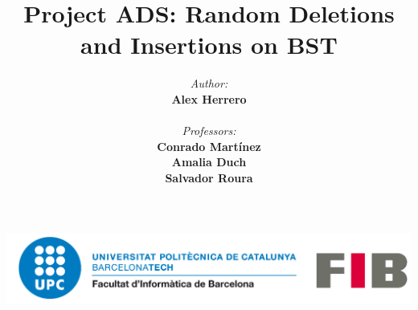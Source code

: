\documentclass{beamer}
\begin{document}

\title[Random Deletions and Insertions on BST]{
    Project ADS: Random Deletions and Insertions on BST
}

\author[A.Herrero]{
  \begin{minipage}[t]{0.5\textwidth}
    \raggedright
    \small \textit{Author:} \\
    \textbf{Alex Herrero} \\
    \vspace{1cm} %
  \end{minipage}%
  \begin{minipage}[t]{0.5\textwidth}
    \raggedleft
    \small \textit{Professors:} \\
    \textbf{Conrado Martínez} \\
    \textbf{Amalia Duch} \\
    \textbf{Salvador Roura} \\
  \end{minipage} \\
  \vspace{1cm} %
  \begin{center}
    \includegraphics[scale=0.15]{logo-upc.png}
  \end{center}
}

\beamertemplatenavigationsymbolsempty




\AtBeginSection[ ]
{
    \begin{frame}
        \tableofcontents[currentsection]
    \end{frame}
}
\end{document}
